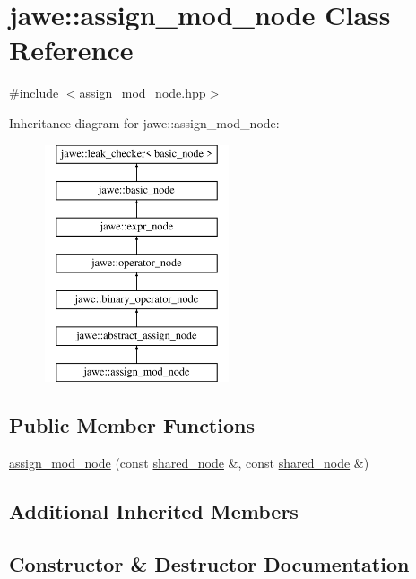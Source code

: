 \hypertarget{classjawe_1_1assign__mod__node}{}\section{jawe\+:\+:assign\+\_\+mod\+\_\+node Class Reference}
\label{classjawe_1_1assign__mod__node}


{\ttfamily \#include $<$assign\+\_\+mod\+\_\+node.\+hpp$>$}

Inheritance diagram for jawe\+:\+:assign\+\_\+mod\+\_\+node\+:\begin{figure}[H]
\begin{center}
\leavevmode
\includegraphics[height=7.000000cm]{classjawe_1_1assign__mod__node}
\end{center}
\end{figure}
\subsection*{Public Member Functions}
\begin{DoxyCompactItemize}
\item 
\hyperlink{classjawe_1_1assign__mod__node_a61568b3132d7dbff69208f0be51f7bf4}{assign\+\_\+mod\+\_\+node} (const \hyperlink{namespacejawe_a3f307481d921b6cbb50cc8511fc2b544}{shared\+\_\+node} \&, const \hyperlink{namespacejawe_a3f307481d921b6cbb50cc8511fc2b544}{shared\+\_\+node} \&)
\end{DoxyCompactItemize}
\subsection*{Additional Inherited Members}


\subsection{Constructor \& Destructor Documentation}
\mbox{\label{classjawe_1_1assign__mod__node_a61568b3132d7dbff69208f0be51f7bf4}} 
